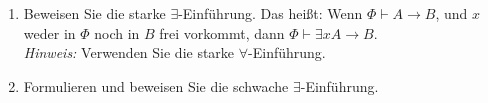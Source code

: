 
\begin{exercise}[104 + 105]
\phantom{}
\begin{enumerate}
  \item Beweisen Sie die starke $\exists$-Einführung. Das heißt: Wenn $\Phi \vdash A \rightarrow B$,
  und $x$ weder in $\Phi$ noch in $B$ frei vorkommt, dann $\Phi \vdash \exists x A \rightarrow B$. \\
  \textit{Hinweis:} Verwenden Sie die starke $\forall$-Einführung.
  \item Formulieren und beweisen Sie die schwache $\exists$-Einführung.

\end{enumerate}


\end{exercise}


\begin{solution}

\phantom{}

\end{solution}



